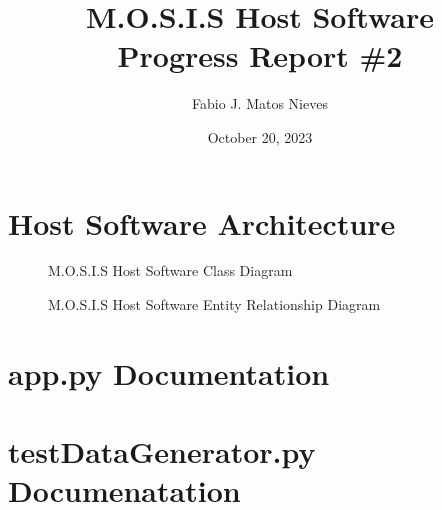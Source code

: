 \documentclass[12pt]{article}
\author{Fabio J. Matos Nieves}
\date{October 20, 2023}
\title{M.O.S.I.S Host Software\\Progress Report \#2}
\begin{document}

\tableofcontents
\newpage
\section{Host Software Architecture}
\begin{figure}[H]
  \caption{M.O.S.I.S Host Software Class Diagram}
\end{figure}
\begin{figure}[H]
  \caption{M.O.S.I.S Host Software Entity Relationship Diagram}
\end{figure}
\appendix
\section{app.py Documentation}

\section{testDataGenerator.py Documenatation}

\end{document}

